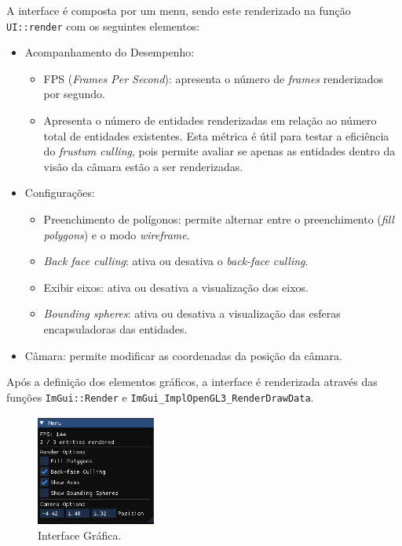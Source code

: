 \documentclass[12pt, a4paper]{article}
\begin{document}
A interface é composta por um menu, sendo este renderizado na função \texttt{UI::render} com os
seguintes elementos:

\begin{itemize}
    \item Acompanhamento do Desempenho:
    \begin{itemize}
        \item FPS (\textit{Frames Per Second}): apresenta o número de \textit{frames}
        renderizados por segundo.
        \item Apresenta o número de entidades renderizadas em relação ao número total de entidades
        existentes. Esta métrica é útil para testar a eficiência do \textit{frustum culling},
        pois permite avaliar se apenas as entidades dentro da visão da câmara estão a ser
        renderizadas.
    \end{itemize}
    \item Configurações:
    \begin{itemize}
        \item Preenchimento de polígonos: permite alternar entre o preenchimento
        (\textit{fill polygons}) e o modo \textit{wireframe}.
        \item \textit{Back face culling}: ativa ou desativa o \textit{back-face culling}.
        \item Exibir eixos: ativa ou desativa a visualização dos eixos.
        \item \textit{Bounding spheres}: ativa ou desativa a visualização das esferas encapsuladoras
        das entidades.
    \end{itemize}
    \item Câmara: permite modificar as coordenadas da posição da câmara.
\end{itemize}

Após a definição dos elementos gráficos, a interface é renderizada através das funções
\texttt{ImGui::Render} e \texttt{ImGui\_ImplOpenGL3\_RenderDrawData}.

\begin{figure}[H]
    \centering
    \includegraphics[width=0.35\textwidth]{res/phase2/UI.png}
    \caption{Interface Gráfica.}
\end{figure}
\end{document}
